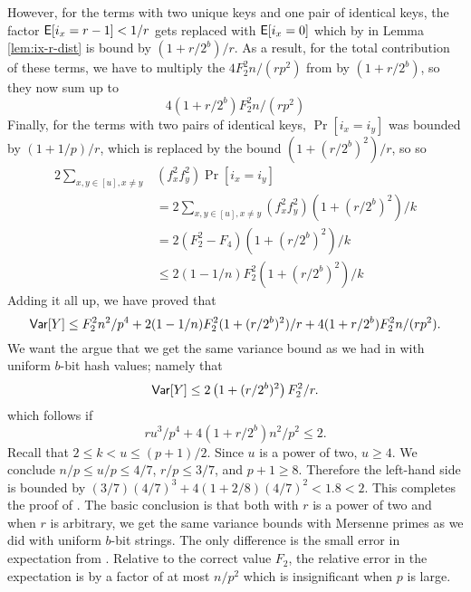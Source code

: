However, for the terms with two unique keys and one pair of identical
keys, the factor $\operatorname*{\sf{E}}[i_x=r-1]<1/r$ gets replaced with $\operatorname*{\sf{E}}[i_x=0]$
which by  in Lemma \ref{lem:ix-r-dist} is bound by
$(1+r/2^b)/r$. As a result, for the total contribution of these terms,
we have to multiply the $4 F_2^2 n/(rp^2)$ from  by
$(1+r/2^b)$, so they now sum up to
\begin{equation}\label{eq:one-pair'}
4 (1+r/2^b) F_2^2 n/(rp^2)
\end{equation}
Finally, for the terms with two pairs of identical keys, $\Pr[i_x=i_y]$ was bounded
by $(1+1/p)/r$, which is replaced by the bound $\left(1+(r/2^b)^2\right)/r$, so
so 
\begin{align}
2\sum_{x,y\in[u],x\neq y}&(f_x^2f_y^2)\Pr[i_x=i_y]\nonumber\\
&=2\sum_{x,y\in[u],x\neq y}(f_x^2f_y^2)(1+(r/2^b)^2)/k\nonumber\\
&=2(F_2^2-F_4)(1+(r/2^b)^2)/k\nonumber\\
&\leq 2(1-1/n)F_2^2(1+(r/2^b)^2)/k\label{eq:two-pairs'}
\end{align}
Adding it all up, we have proved that 
\[{\sf Var}[Y]\leq F_2^2 n^2/p^4+2(1-1/n)F_2^2(1+(r/2^b)^2)/r+4(1+r/2^b)F_2^2 n/(rp^2).\]
We want the argue that we get the same variance bound as we had in 
 with uniform $b$-bit hash values; namely that
\begin{equation}\label{eq:Var-Mersenne-arb-r}
{\sf Var}[Y]\leq 2\left(1+(r/2^b)^2\right)F_2^2/r.
\end{equation}
which follows if 
\[ru^3/p^4+4(1+r/2^b)n^2/p^2\leq 2.\]
Recall that $2\leq k<u\leq (p+1)/2$. Since $u$ is a power of two,
$u\geq 4$. We conclude $n/p\leq u/p\leq 4/7$, $r/p\leq 3/7$, and
$p+1\geq 8$. Therefore the left-hand side is bounded by
$(3/7)(4/7)^3+4(1+2/8)(4/7)^2<1.8<2$.  This completes the proof of
. The basic conclusion is that both with
$r$ is a power of two and when $r$ is arbitrary, we get the same
variance bounds with Mersenne primes as we did with uniform $b$-bit
strings. The only difference is the small error in expectation from
. Relative to the correct value $F_2$, the
relative error in the expectation is by a factor of at most
$n/p^2$ which is insignificant when $p$ is large.


